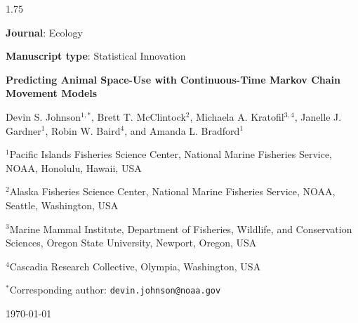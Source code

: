 \documentclass[12pt]{article}
\begin{document}
\begin{spacing}{1.75}


\setlength{\parindent}{0pt}
{\bf Journal}: Ecology 

{\bf Manuscript type}: Statistical Innovation
\bigskip

\begin{center}

{\large \bf Predicting Animal Space-Use with Continuous-Time Markov Chain Movement Models}

\bigskip\bigskip

\begin{minipage}{0.8\textwidth}
\begin{center}
{Devin S. Johnson}$^{1,*}$, Brett T. McClintock$^2$, Michaela A. Kratofil$^{3,4}$, Janelle J. Gardner$^1$, Robin W. Baird$^4$, and Amanda L. Bradford$^1$ \bigskip

$^1$Pacific Islands Fisheries Science Center, National Marine Fisheries Service, NOAA, Honolulu, Hawaii, USA 

$^2$Alaska Fisheries Science Center, National Marine Fisheries Service, NOAA, Seattle, Washington, USA 


$^3$Marine Mammal Institute, Department of Fisheries, Wildlife, and Conservation Sciences, Oregon State University, Newport, Oregon, USA

$^4$Cascadia Research Collective, Olympia, Washington, USA

$^*$Corresponding author: {\tt devin.johnson@noaa.gov}
\end{center}
\end{minipage}

\bigskip

\today

\end{center}




\raggedright
\setlength{\parindent}{2em}
\raggedbottom
\linenumbers



\end{spacing}
\end{document}
